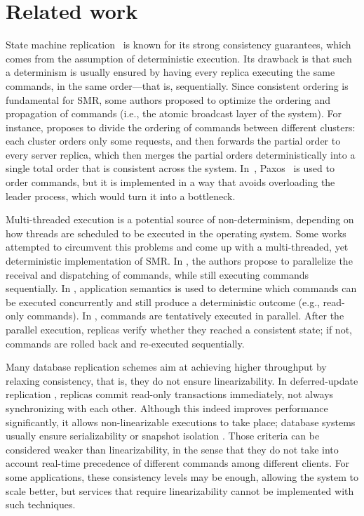 \section{Related work}
\label{sec:rw}

State machine replication~\cite{Lam78, Sch90, Kapritsos:2012um, kotla2004htbft, santos2013htsmr} is known for its strong consistency guarantees, which comes from the assumption of deterministic execution.
Its drawback is that such a determinism is usually ensured by having every replica executing the same commands, in the same order---that is, sequentially.
Since consistent ordering is fundamental for SMR, some authors proposed to optimize the ordering and propagation of commands (i.e., the atomic broadcast layer of the system).
For instance, \cite{kapritsos2010scalable} proposes to divide the ordering of commands between different clusters: each cluster orders only some requests, and then forwards the partial order to every server replica, which then merges the partial orders deterministically into a single total order that is consistent across the system.
In~\cite{biely2012spaxos}, Paxos~\cite{Lamport:1998ea} is used to order commands, but it is implemented in a way that avoids overloading the leader process, which would turn it into a bottleneck.

Multi-threaded execution is a potential source of non-determinism, depending on how threads are scheduled to be executed in the operating system.
Some works attempted to circumvent this problems and come up with a multi-threaded, yet deterministic implementation of SMR.
In \cite{santos2013htsmr}, the authors propose to parallelize the receival and dispatching of commands, while still executing commands sequentially.
In \cite{kotla2004htbft}, application semantics is used to determine which commands can be executed concurrently and still produce a deterministic outcome (e.g., read-only commands).
In \cite{Kapritsos:2012um}, commands are tentatively executed in parallel.
After the parallel execution, replicas verify whether they reached a consistent state; if not, commands are rolled back and re-executed sequentially.

Many database replication schemes aim at achieving higher throughput by relaxing consistency, that is, they do not ensure linearizability.
In deferred-update replication \cite{sciascia2012sdur, chundi96dur, kobus2013hybrid, SousaOMP01}, replicas commit read-only transactions immediately, not always synchronizing with each other.
Although this indeed improves performance significantly, it allows non-linearizable executions to take place; database systems usually ensure serializability \cite{BHG87} or snapshot isolation \cite{LinKJPA09}.
Those criteria can be considered weaker than linearizability, in the sense that they do not take into account real-time precedence of different commands among different clients. 
For some applications, these consistency levels may be enough, allowing the system to scale better, but services that require linearizability cannot be implemented with such techniques.

